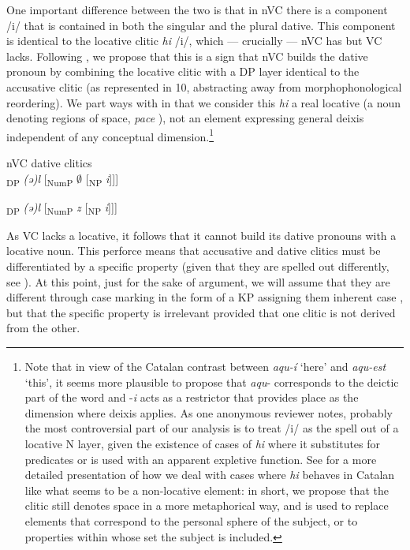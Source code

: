 \documentclass[output=paper,modfonts,nonflat,newtxmath,colorlinks,citecolor=brown]{langsci/langscibook}
\begin{document}
One important difference between the two is that in nVC there is a component /i/ that is contained in both the singular and the plural dative. This component is identical to the locative clitic \textit{hi} /i/, which — crucially — nVC has but VC lacks. Following \citet{Martin2012}, we propose that this is a sign that nVC builds the dative pronoun by combining the locative clitic with a DP layer identical to the accusative clitic (as represented in 10, abstracting away from morphophonological reordering). We part ways with \citet{Martin2012} in that we consider this \textit{hi} a real locative (a noun denoting regions of space, \textit{pace} \citealt{Rigau1978, Rigau1982}), not an element expressing general deixis independent of any conceptual dimension.\footnote{Note that in view of the Catalan contrast between \textit{aqu-í} ‘here’ and \textit{aqu-est} ‘this’, it seems more plausible to propose that \textit{aqu}{}- corresponds to the deictic part of the word and -\textit{i} acts as a restrictor that provides place as the dimension where deixis applies. As one anonymous reviewer notes, probably the most controversial part of our analysis is to treat /i/ as the spell out of a locative N layer, given the existence of cases of \textit{hi} where it substitutes for predicates or is used with an apparent expletive function. See \citet{CabréFábregas2019} for a more detailed presentation of how we deal with cases where \textit{hi} behaves in Catalan like what seems to be a non-locative element: in short, we propose that the clitic still denotes space in a more metaphorical way, and is used to replace elements that correspond to the personal sphere of the subject, or to properties within whose set the subject is included.}

\ea%
 nVC dative clitics \\
    \label{ex:cabre:10}
    \ea {[}\textsubscript{DP}  \textit{(ǝ)l}  [\textsubscript{NumP}  $\emptyset$  [\textsubscript{NP}  \textit{i}{]]]}

    \ex  {[}\textsubscript{DP}  \textit{(ǝ)l}  [\textsubscript{NumP}  \textit{z} [\textsubscript{NP}  \textit{i}]{]]}
    \z
    \z




As VC lacks a locative, it follows that it cannot build its dative pronouns with a locative noun. This perforce means that accusative and dative clitics must be differentiated by a specific property (given that they are spelled out differently, see ). At this point, just for the sake of argument, we will assume that they are different through case marking in the form of a KP assigning them inherent case , but that the specific property is irrelevant provided that one clitic is not derived from the other.
\end{document}
